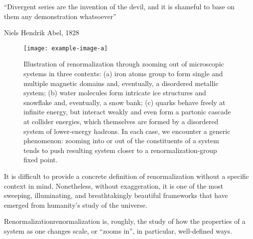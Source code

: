 \epigraph{``Divergent series are the invention of the devil, and it is shameful to base on them any demonstration whatsoever''}{Niels Hendrik Abel, 1828}

\begin{figure}[]
    \centering
    \texttt{[image: example-image-a]}
    \caption[Illustration of renormalization in three contexts (magnetic domains, snowflakes, and jets) which exemplify how zooming into or out of the constituents of a system tends to take the system nearer to a renormalization-group fixed point.]{
        Illustration of renormalization through zooming out of microscopic systems in three contexts:
        (a) iron atoms group to form single and multiple magnetic domains and, eventually, a disordered metallic system;
        (b) water molecules form intricate ice structures and snowflake and, eventually, a snow bank;
        (c) quarks behave freely at infinite energy, but interact weakly and even form a partonic cascade at collider energies, which themselves are formed by a disordered system of lower-energy hadrons.
        In each case, we encounter a generic phenomenon:
        zooming into or out of the constituents of a system tends to push resulting system closer to a renormalization-group fixed point.
    }
    \label{fig:renormalization}
\end{figure}


It is difficult to provide a concrete definition of renormalization without a specific context in mind.
%
Nonetheless, without exaggeration, it is one of the most sweeping, illuminating, and breathtakingly beautiful frameworks that have emerged from humanity's study of the universe.


\begin{definitionbox}{Renormalization}{renormalization}
    \vspace{3pt}
     is, roughly, the study of how the properties of a system as one changes scale, or ``zooms in'', in particular, well-defined ways.
\end{definitionbox}

